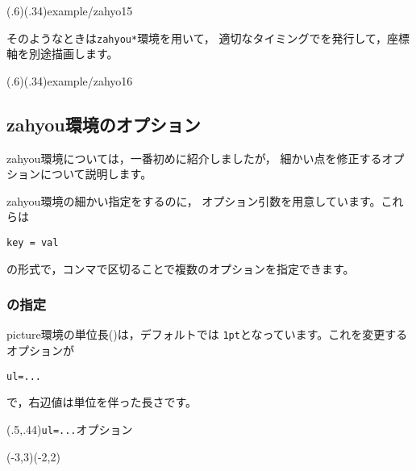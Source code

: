 \showexample[座標軸描画のタイミング](.6)(.34){example/zahyo15}

そのようなときは\verb+zahyou*+環境を用いて，
適切なタイミングでを発行して，座標軸を別途描画します。

(.6)(.34){example/zahyo16}

\subsection{\textsf{zahyou}環境のオプション}
\textsf{zahyou}環境については，一番初めに紹介しましたが，
細かい点を修正するオプションについて説明します。

\textsf{zahyou}環境の細かい指定をするのに，
オプション引数を用意しています。これらは
\begin{jquote}
\begin{verbatim}
key = val
\end{verbatim}
\end{jquote}
の形式で，コンマで区切ることで複数のオプションを指定できます。
\subsubsection{\texorpdfstring{}{unitlength}の指定}
\textsf{picture}環境の単位長()は，デフォルトでは
\verb/1pt/となっています。これを変更するオプションが
\begin{jquote}
\begin{verbatim}
ul=...
\end{verbatim}
\end{jquote}
で，右辺値は単位を伴った長さです。

\begin{showEx}(.5,.44){\texttt{ul=...}オプション}
\begin{zahyou}[ul=8mm]%
  (-3,3)(-2,2)%
\end{zahyou}%
\end{showEx}

